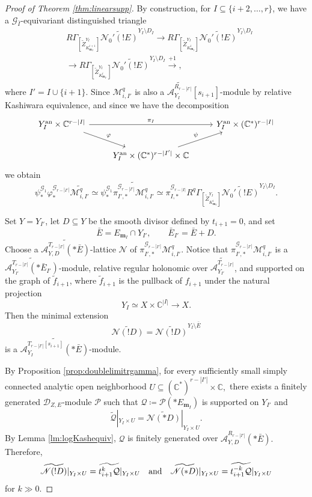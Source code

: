 \documentclass{amsart}
\theoremstyle{plain}
\numberwithin{theorem}{section}
\theoremstyle{definition}
\theoremstyle{remark}
\theoremstyle{definition}
\newcommand{\wt}{\widetilde}
\newcommand{\C}{\mathbb{C}} %
\newcommand{\cN}{\mathcal{N}}
\newcommand{\cP}{\mathcal{P}}
\newcommand{\cQ}{\mathcal{Q}}
\newcommand{\bm}{\mathbf{m}}
\newcommand{\sM}{\mathscr{M}}
\newcommand{\sN}{\mathscr{N}}
\newcommand{\sA}{\mathscr{A}}
\newcommand{\sG}{\mathscr{G}}
\newcommand{\shD}{\mathscr{D}}
\newcommand{\an}{\textup{an}}
\begin{document}
\begin{proof}[Proof of Theorem \ref{thm:linearsupp}]
By construction, for $I\subseteq\{i+2,\dots,r\}$, we have a
$\sG_{\bar I}$-equivariant distinguished triangle
\begin{equation}\label{eq:distria1}
\begin{split}
&
R\Gamma_{[\wt Z^{Y_I}_{K^{i+1}_{\bm_I}}]}
\wt{\cN_0'(!E)}^{Y_I\setminus D_I}
\to
R\Gamma_{[\wt Z^{Y_I}_{K^i_{\bm_I}}]}
\wt{\cN_0'(!E)}^{Y_I\setminus D_I}
\\
&\to
R\Gamma_{[\wt Z^{Y_I}_{K^i_{\bm_{I'}}}]}
\wt{\cN_0'(!E)}^{Y_I\setminus D_I}
\xrightarrow{+1},
\end{split}
\end{equation}
where
$I'=I\cup\{i+1\}.$
Since $\sM^q_{i,I'}$ is also a
$\wt{\sA_{Y_I}^{R_{r-|I'|}}}[s_{i+1}]$-module by relative Kashiwara equivalence, and since we have the decomposition
\[
\begin{tikzcd}
Y_I^\an\times \C^{r-|I|}
\arrow[rr,"\pi_I"]
\arrow[rd,"\varphi"]
&&
Y_I^\an\times(\C^*)^{r-|I|}
\\
&
Y_I^\an\times(\C^*)^{r-|I'|}\times\C
\arrow[ru,"\psi"]
&
\end{tikzcd}
\]
we obtain
\begin{equation}\label{eq:splitequiv}
\psi_*^{\sG_1}
\varphi_*^{\sG_{r-|I'|}}
\wt{\sM^q_{i,I'}}
\simeq
\psi_*^{\sG_1}
\widetilde{
\pi_{I',*}^{\sG_{r-|I'|}}\sM^q_{i,I'}
}
\simeq
\pi_{I,*}^{\sG_{r-|I|}}
R^q\Gamma_{[\wt Z^{Y_I}_{K^i_{\bm_I}}]}
\wt{\cN_0'(!E)}^{Y_I\setminus D_I}.
\end{equation}

Set $Y=Y_{I'}$, let $D\subseteq Y$ be the smooth divisor defined by
$t_{i+1}=0$, and set
\[
\bar E=E_{\bm_I}\cap Y_{I'},
\qquad
\bar E_{I'}=\bar E+D.
\]
Choose a $\wt{\sA_{Y,D}^{T_{r-|I'|}}(*\bar E)}$-lattice $\sN$ of
$\pi_{I',*}^{\sG_{r-|I'|}}\sM^q_{i,I'}.$
Notice that 
$\pi_{I',*}^{\sG_{r-|I'|}}\sM^q_{i,I'}$
is a $\wt{\sA_{Y_{I'}}^{T_{r-|I'|}}(*\bar E_{I'})}$-module, relative regular
holonomic over $\wt{\sA_{Y_{I'}}^{T_{r-|I'|}}}$, and supported on the graph of
$\wt f_{i+1}$, where $\wt f_{i+1}$ is the pullback of $f_{i+1}$ under the
natural projection
\[
Y_I\simeq X\times\C^{|I|}\to X.
\]
Then the minimal extension
\[
\wt{\sN(!D)}
=
\wt{\sN(!D)}^{Y_I\setminus\bar E}
\]
is a $\wt{\sA_{Y_I}^{T_{r-|I'|}[s_{i+1}]}(*\bar E)}$-module.

By Proposition \ref{prop:doublelimitrgamma}, for every sufficiently small
simply connected analytic open neighborhood
$U\subseteq(\C^*)^{r-|I'|}\times\C,$
there exists a finitely generated $\shD_{Z,E}$-module $\cP$ such that
$\cQ\coloneqq\cP(*E_{\bm_I})$
is supported on $Y_{I'}$ and
\[
\wt{\cQ}|_{Y_I\times U}
=
\wt{\sN(*D)}|_{Y_I\times U}.
\]
By Lemma \ref{lm:logKashequiv}, $\cQ$ is finitely generated over
$\sA_{Y,D}^{R_{r-|I'|}}(*\bar E).$
Therefore,
\[
\wt{\sN(!D)}|_{Y_I\times U}
=
\wt{t_{i+1}^k\cQ}|_{Y_I\times U}
\quad \textup{and} \quad
\wt{\sN(*D)}|_{Y_I\times U}
=
\wt{t_{i+1}^{-k}\cQ}|_{Y_I\times U}
\]
for $k\gg 0$.


\end{proof}
\end{document}
